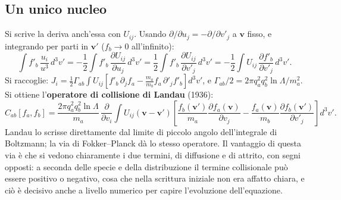 \subsection{Un unico nucleo}
Si scrive la deriva anch'essa con $U_{ij}$. Usando $\partial/\partial u_j=-\partial/\partial v'_j$ a $\mathbf{v}$ fisso, e integrando per parti in $\mathbf{v}'$ ($f_b\to0$ all'infinito):
\begin{equation}
\int f'_b\,\frac{u_i}{u^3}\,d^3v'=-\frac12\int f'_b\,\frac{\partial U_{ij}}{\partial u_j}\,d^3v'=\frac12\int f'_b\,\frac{\partial U_{ij}}{\partial v'_j}\,d^3v'=-\frac12\int U_{ij}\,\frac{\partial f'_b}{\partial v'_j}\,d^3v'.
\end{equation}
Si raccoglie: $J_i=\frac12\Gamma_{ab}\int U_{ij}\left[f'_b\,\partial_jf_a-\frac{m_a}{m_b}f_a\,\partial'_jf'_b\right]d^3v'$, e $\Gamma_{ab}/2=2\pi q_a^2q_b^2\ln\Lambda/m_a^2$. Si ottiene l'\textbf{operatore di collisione di Landau} (1936):
\begin{equation}
C_{ab}[f_a,f_b]=\frac{2\pi q_a^2q_b^2\ln\Lambda}{m_a}\,\frac{\partial}{\partial v_i}\int U_{ij}(\mathbf{v}-\mathbf{v}')\left[\frac{f_b(\mathbf{v}')}{m_a}\frac{\partial f_a(\mathbf{v})}{\partial v_j}-\frac{f_a(\mathbf{v})}{m_b}\frac{\partial f_b(\mathbf{v}')}{\partial v'_j}\right]d^3v'.
\end{equation}
Landau lo scrisse direttamente dal limite di piccolo angolo dell'integrale di Boltzmann; la via di Fokker--Planck dà lo stesso operatore. Il vantaggio di questa via è che si vedono chiaramente i due termini, di diffusione e di attrito, con segni opposti: a seconda delle specie e della distribuzione il termine collisionale può essere positivo o negativo, cosa che nella scrittura iniziale non era affatto chiara, e ciò è decisivo anche a livello numerico per capire l'evoluzione dell'equazione.

